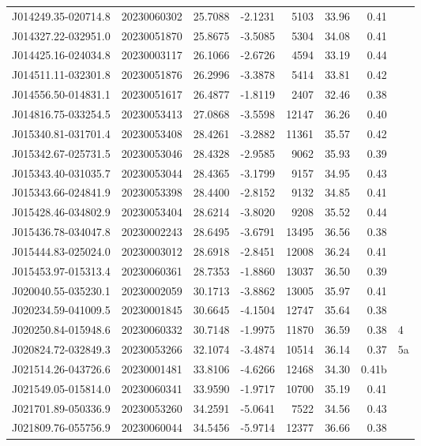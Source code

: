 \documentclass{article}
\begin{document}
\begin {longtable}{|l|l|r|r|r|r|r|l|}
 J014249.35-020714.8&  20230060302&   25.7088&   -2.1231&  5103& 33.96& 0.41&\\
 J014327.22-032951.0&  20230051870&   25.8675&   -3.5085&  5304& 34.08& 0.41&\\
 J014425.16-024034.8&  20230003117&   26.1066&   -2.6726&  4594& 33.19& 0.44&\\
 J014511.11-032301.8&  20230051876&   26.2996&   -3.3878&  5414& 33.81& 0.42&\\
 J014556.50-014831.1&  20230051617&   26.4877&   -1.8119&  2407& 32.46& 0.38&\\
 J014816.75-033254.5&  20230053413&   27.0868&   -3.5598& 12147& 36.26& 0.40&\\
 J015340.81-031701.4&  20230053408&   28.4261&   -3.2882& 11361& 35.57& 0.42&\\
 J015342.67-025731.5&  20230053046&   28.4328&   -2.9585&  9062& 35.93& 0.39&\\
 J015343.40-031035.7&  20230053044&   28.4365&   -3.1799&  9157& 34.95& 0.43&\\
 J015343.66-024841.9&  20230053398&   28.4400&   -2.8152&  9132& 34.85& 0.41&\\
 J015428.46-034802.9&  20230053404&   28.6214&   -3.8020&  9208& 35.52& 0.44&\\
 J015436.78-034047.8&  20230002243&   28.6495&   -3.6791& 13495& 36.56& 0.38&\\
 J015444.83-025024.0&  20230003012&   28.6918&   -2.8451& 12008& 36.24& 0.41&\\
 J015453.97-015313.4&  20230060361&   28.7353&   -1.8860& 13037& 36.50& 0.39&\\
 J020040.55-035230.1&  20230002059&   30.1713&   -3.8862& 13005& 35.97& 0.41&\\
 J020234.59-041009.5&  20230001845&   30.6645&   -4.1504& 12747& 35.64& 0.38&\\
 J020250.84-015948.6&  20230060332&   30.7148&   -1.9975& 11870& 36.59& 0.38&4\\%
 J020824.72-032849.3&  20230053266&   32.1074&   -3.4874& 10514& 36.14& 0.37&5a\\%
 J021514.26-043726.6&  20230001481&   33.8106&   -4.6266& 12468& 34.30& 0.41b\\%
 J021549.05-015814.0&  20230060341&   33.9590&   -1.9717& 10700& 35.19& 0.41&\\
 J021701.89-050336.9&  20230053260&   34.2591&   -5.0641&  7522& 34.56& 0.43&\\
 J021809.76-055756.9&  20230060044&   34.5456&   -5.9714& 12377& 36.66& 0.38&\\

\end{longtable}
\end{document}

